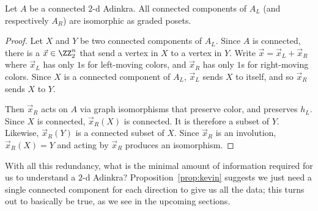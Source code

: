 \begin{prop}
\label{prop:kevin}
Let $A$ be a connected $2$-d Adinkra.  All connected components of $A_L$ (and respectively $A_R$) are isomorphic as graded posets.
\end{prop}

\begin{proof}
Let $X$ and $Y$ be two connected components of $A_L$.  Since $A$ is connected, there is a $\vec{x}\in \ZZ_2^n$ that send a vertex in $X$ to a vertex in $Y$.  Write $\vec{x}=\vec{x}_L+\vec{x}_R$ where $\vec{x}_L$ has only $1$s for left-moving colors, and $\vec{x}_R$ has only $1$s for right-moving colors.  Since $X$ is a connected component of $A_L$, $\vec{x}_L$ sends $X$ to itself, and so $\vec{x}_R$ sends $X$ to $Y$.

Then $\vec{x}_R$ acts on $A$ via graph isomorphisms that preserve color, and preserves $h_L$.  Since $X$ is connected, $\vec{x}_R(X)$ is connected.  It is therefore a subset of $Y$.  Likewise, $\vec{x}_R(Y)$ is a connected subset of $X$.  Since $\vec{x}_R$ is an involution, $\vec{x}_R(X)=Y$ and acting by $\vec{x}_R$ produces an isomorphism.
\end{proof}

With all this redundancy, what is the minimal amount of information required for us to understand a $2$-d Adinkra? Proposition~\ref{prop:kevin} suggests we just need a single connected component for each direction to give us all the data; this turns out to basically be true, as we see in the upcoming sections.


